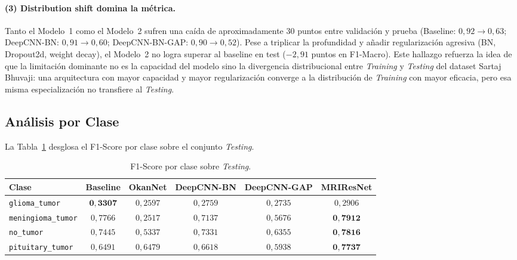 \paragraph*{(3) Distribution shift domina la métrica.} Tanto el
Modelo~1 como el Modelo~2 sufren una caída de aproximadamente
$30$ puntos entre validación y prueba (Baseline:
$0{,}92 \to 0{,}63$; DeepCNN-BN: $0{,}91 \to 0{,}60$;
DeepCNN-BN-GAP: $0{,}90 \to 0{,}52$). Pese a triplicar la
profundidad y añadir regularización agresiva (BN, Dropout2d,
weight decay), el Modelo~2 no logra superar al baseline en test
($-2{,}91$ puntos en F1-Macro). Este hallazgo refuerza la idea
de que la limitación dominante no es la capacidad del modelo
sino la divergencia distribucional entre \textit{Training} y
\textit{Testing} del dataset Sartaj Bhuvaji: una arquitectura
con mayor capacidad y mayor regularización converge a la
distribución de \textit{Training} con mayor eficacia, pero esa
misma especialización no transfiere al \textit{Testing}.

\subsection{Análisis por Clase}
\label{sec:analisis-clase}

La Tabla~\ref{tab:f1-clase} desglosa el F1-Score por clase
sobre el conjunto \textit{Testing}.

\begin{table}[!t]
\centering
\caption{F1-Score por clase sobre \textit{Testing}.}
\label{tab:f1-clase}
\renewcommand{\arraystretch}{1.15}
\footnotesize
\setlength{\tabcolsep}{6pt}
\begin{tabular}{@{}lccccc@{}}
\toprule
\textbf{Clase} & \textbf{Baseline} & \textbf{OkanNet} &
\textbf{DeepCNN-BN} & \textbf{DeepCNN-GAP} & \textbf{MRIResNet} \\
\midrule
\texttt{glioma\_tumor}     & $\mathbf{0{,}3307}$ & $0{,}2597$ & $0{,}2759$ & $0{,}2735$ & $0{,}2906$ \\
\texttt{meningioma\_tumor} & $0{,}7766$ & $0{,}2517$ & $0{,}7137$ & $0{,}5676$ & $\mathbf{0{,}7912}$ \\
\texttt{no\_tumor}         & $0{,}7445$ & $0{,}5337$ & $0{,}7331$ & $0{,}6355$ & $\mathbf{0{,}7816}$ \\
\texttt{pituitary\_tumor}  & $0{,}6491$ & $0{,}6479$ & $0{,}6618$ & $0{,}5938$ & $\mathbf{0{,}7737}$ \\
\bottomrule
\end{tabular}
\end{table}

